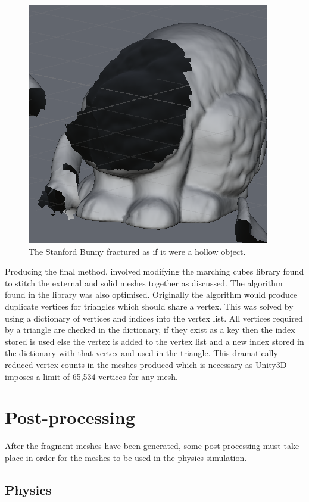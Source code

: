 \begin{figure}
\centerline{\includegraphics[scale=1]{Porcelain2.png}}
\caption{The Stanford Bunny fractured as if it were a hollow object.}
\label{fig:3.14}
\end{figure}

Producing the final method, involved modifying the marching cubes library found to stitch the external and solid meshes together as discussed. The algorithm found in the library was also optimised. Originally the algorithm would produce duplicate vertices for triangles which should share a vertex. This was solved by using a dictionary of vertices and indices into the vertex list. All vertices required by a triangle are checked in the dictionary, if they exist as a key then the index stored is used else the vertex is added to the vertex list and a new index stored in the dictionary with that vertex and used in the triangle. This dramatically reduced vertex counts in the meshes produced which is necessary as Unity3D imposes a limit of 65,534 vertices for any mesh.

\section{Post-processing}

After the fragment meshes have been generated, some post processing must take place in order for the meshes to be used in the physics simulation.

\subsection{Physics}

